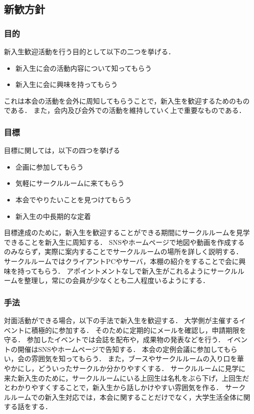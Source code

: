 \subsection*{新歓方針}


\subsubsection*{目的}
新入生歓迎活動を行う目的として以下の二つを挙げる．
\begin{itemize}
\item 新入生に会の活動内容について知ってもらう
\item 新入生に会に興味を持ってもらう
\end{itemize}
これは本会の活動を会外に周知してもらうことで，新入生を歓迎するためのものである．
また，会内及び会外での活動を維持していく上で重要なものである．

\subsubsection*{目標}
目標に関しては，以下の四つを挙げる
\begin{itemize}
\item 企画に参加してもらう
\item 気軽にサークルルームに来てもらう
\item 本会でやりたいことを見つけてもらう
\item 新入生の中長期的な定着
\end{itemize}
目標達成のために，新入生を歓迎することができる期間にサークルルームを見学できることを新入生に周知する．
SNSやホームページで地図や動画を作成するのみならず，実際に案内することでサークルルームの場所を詳しく説明する．
サークルルームではクライアントPCやサーバ，本棚の紹介をすることで会に興味を持ってもらう．
アポイントメントなしで新入生がこれるようにサークルルームを整理し，常に\secondGrade{}の会員が少なくとも二人程度いるようにする．

\subsubsection*{手法}
対面活動ができる場合，以下の手法で新入生を歓迎する．
大学側が主催するイベントに積極的に参加する．
そのために定期的にメールを確認し，申請期限を守る．
参加したイベントでは会誌を配布や，成果物の発表などを行う．
イベントの開催はSNSやホームページで告知する．
本会の定例会議に参加してもらい，会の雰囲気を知ってもらう．
また，ブースやサークルルームの入り口を華やかにし，どういったサークルか分かりやすくする．
サークルルームに見学に来た新入生のために，サークルルームにいる上回生は名札をぶら下げ，上回生だとわかりやすくすることで，新入生から話しかけやすい雰囲気を作る．
サークルルームでの新入生対応では，本会に関することだけでなく，大学生活全体に関する話をする．